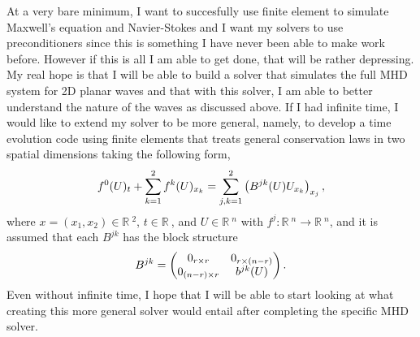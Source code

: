 \documentclass{article}
\newcommand{\R}{\mathbb{R}\ }
\begin{document}
At a very bare minimum, I want to succesfully use finite element to simulate Maxwell's equation and Navier-Stokes and I want my solvers to use preconditioners since this is something I have never been able to make work before. However if this is all I am able to get done, that will be rather depressing. My real hope is that I will be able to build a solver that simulates the full MHD system for 2D planar waves and that with this solver, I am able to better understand the nature of the waves as discussed above. If I had infinite time, I would like to extend my solver to be more general, namely, to develop a time evolution code using finite elements that treats general conservation laws in two spatial dimensions taking the following form,
\begin{equation}
f^0(U)_t+\sum_{k=1}^2 f^k(U)_{x_k}= \sum_{j,k=1}^2\left( B^{jk}(U)U_{x_k}\right)_{x_j}, 
\notag
\end{equation}
where $x = (x_1,x_2)\in \R^2$, $t\in \R$, and $U\in \R^n$ with $f^j:\R^n\to \R^n$, and it is assumed that each $B^{jk}$ has the block structure
\begin{equation}
B^{jk}  = \begin{pmatrix}
0_{r\times r}&0_{r\times (n-r)}\\
0_{(n-r)\times r}&b^{jk}(U)
\end{pmatrix}.
\notag
\end{equation}
Even without infinite time, I hope that I will be able to start looking at what creating this more general solver would entail after completing the specific MHD solver. 
\end{document}

